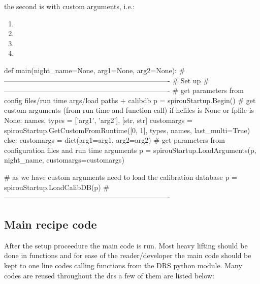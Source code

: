 \noindent the second is with custom arguments, i.e.:
\begin{enumerate}
	\item \spirouStartup{}
	\item \spirouStartup{}
	\item \spirouStartup{}
	\item \spirouStartup{}
\end{enumerate}
\begin{pythonbox}

def main(night_name=None, arg1=None, arg2=None):
    # ----------------------------------------------------------------------
    # Set up
    # ----------------------------------------------------------------------
    # get parameters from config files/run time args/load paths + calibdb
    p = spirouStartup.Begin()
    # get custom arguments (from run time and function call)
    if hcfiles is None or fpfile is None:
        names, types = ['arg1', 'arg2'], [str, str]
        customargs = spirouStartup.GetCustomFromRuntime([0, 1], types, names,
                                                        last_multi=True)
    else:
        customargs = dict(arg1=arg1, arg2=arg2)
    # get parameters from configuration files and run time arguments
    p = spirouStartup.LoadArguments(p, night_name, customargs=customargs)

    # as we have custom arguments need to load the calibration database
    p = spirouStartup.LoadCalibDB(p)
    # ----------------------------------------------------------------------
\end{pythonbox}


\subsection{Main recipe code}
\label{ch:the_recipes:gen_layout:main_recipe_code}

After the setup proceedure the main code is run. Most heavy lifting should be done in functions and for ease of the reader/developer the main code should be kept to one line codes calling functions from the DRS python module. Many codes are reused throughout the drs a few of them are listed below:

